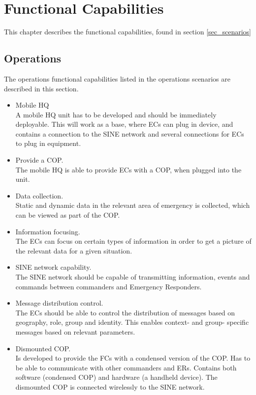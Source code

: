 \chapter{Functional Capabilities}
\label{chp_capabilities}
This chapter describes the functional capabilities, found in section \ref{sec_scenarios}

\section{Operations}
The operations functional capabilities listed in the operations scenarios are described in this section.
\begin{itemize}
	\item Mobile HQ\\
	A mobile HQ unit has to be developed and should be immediately deployable. This will work as a base, where ECs can plug in device, and contains a connection to the SINE network and several connections for ECs to plug in equipment. 
	\item Provide a COP.\\
	The mobile HQ is able to provide ECs with a COP, when plugged into the unit.
	\item Data collection.\\
	Static and dynamic data in the relevant area of emergency is collected, which can be viewed as part of the COP.
	\item Information focusing.\\
	The ECs can focus on certain types of information in order to get a picture of the relevant data for a given situation.
	\item SINE network capability.\\
	The SINE network should be capable of transmitting information, events and commands between commanders and Emergency Responders.
	\item Message distribution control. \\
	The ECs should be able to control the distribution of messages based on geography, role, group and identity. This enables context- and group- specific messages based on relevant parameters.
	\item Dismounted COP. \\
	Is developed to provide the FCs with a condensed version of the COP. Has to be able to communicate with other commanders and ERs. Contains both software (condensed COP) and hardware (a handheld device). The dismounted COP is connected wirelessly to the SINE network.
\end{itemize}

